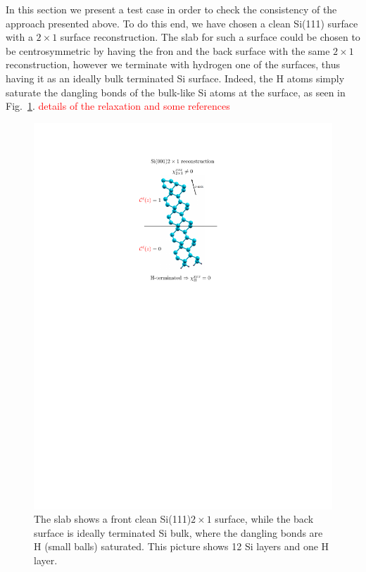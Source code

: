 In this section we present a test case in order to check the
consistency of the approach presented above. To do this end,  we have chosen
a clean Si(111) surface  with a $2\times 1$ surface reconstruction.
The slab for such a surface could be chosen to be centrosymmetric 
by having the fron and the back surface with the same $2\times 1$
reconstruction, however we terminate with hydrogen one of the
surfaces, thus having it as an ideally bulk terminated Si
surface. Indeed, the H atoms simply saturate the dangling bonds of the
bulk-like Si atoms at the surface, as seen in Fig.~\ref{si2x1}. \textcolor{red}{details of the
 relaxation and some references}
\begin{figure}
\centering 
\includegraphics[scale=.3]{images/si2x1}
\caption{The slab shows a front clean Si(111)$2\times 1$ surface,
  while the back surface is ideally terminated Si bulk, where the
  dangling bonds are H (small balls) saturated. This picture shows 12
  Si layers and one H layer. 
\label{si2x1}} 
\end{figure}
